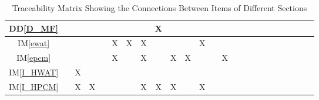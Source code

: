 \documentclass[12pt]{article}
\newcommand{\ddref}[1]{DD\ref{#1}}
\newcommand{\iref}[1]{IM\ref{#1}}
\begin{document}
\begin{table}[h!]
\begin{tabular}{|c|c|c|c|c|c|c|c|c|c|c|c|c|c|c|c|c|c|c|c|c|c|c|c|}
    \ddref{D_MF}     &              &              &              &           &             &                  &                 & X             &              &             &             &               &               \\ \hline
    \iref{ewat}      &              &              &              &           & X           & X                & X               &               &              &             & X           &               &               \\ \hline
    \iref{epcm}      &              &              &              &           & X           &                  & X               &               & X            & X           &             &               & X             \\ \hline
    \iref{I_HWAT}    &              & X            &              &           &             &                  &                 &               &              &             &             &               &               \\ \hline
    \iref{I_HPCM}    &              & X            & X            &           &             &                  & X               & X             & X            &             & X           &               &               \\
    \hline
  \end{tabular}
  \caption{Traceability Matrix Showing the Connections Between Items of Different Sections}
  \label{Table:trace}
\end{table}
\end{document}
